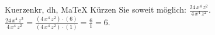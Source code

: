 \begin{MAufgabe}{Kuerzen}{kr, dh, MaTeX}
K\"urzen Sie soweit m\"oglich: $\frac{24\, x^4\, z^2}{4\, x^4\, z^2}$.\\ 
\ifLsg\MLoesung
\quad $\frac{24\, x^4\, z^2}{4\, x^4\, z^2}=\frac{(4\, x^4\, z^2)\cdot(6)}{(4\, x^4\, z^2)\cdot(1)}=\frac{6}{1}=6$.\else\relax\fi
 \end{MAufgabe}